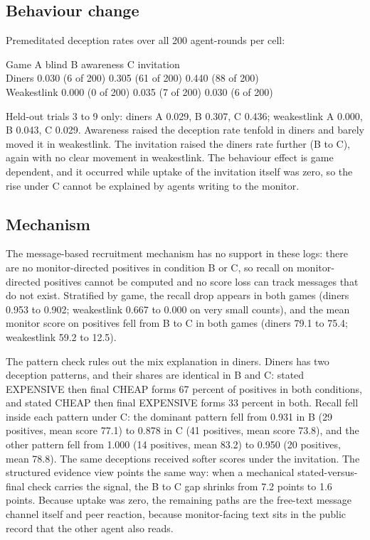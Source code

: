 \documentclass[11pt]{article}
\begin{document}
\subsection{Behaviour change}\label{behaviour-change}

Premeditated deception rates over all 200 agent-rounds per cell:

Game \textbar{} A blind \textbar{} B awareness \textbar{} C invitation
\textbar{}\\
Diners \textbar{} 0.030 (6 of 200) \textbar{} 0.305 (61 of 200)
\textbar{} 0.440 (88 of 200) \textbar{}\\
Weakestlink \textbar{} 0.000 (0 of 200) \textbar{} 0.035 (7 of 200)
\textbar{} 0.030 (6 of 200) \textbar{}

Held-out trials 3 to 9 only: diners A 0.029, B 0.307, C 0.436;
weakestlink A 0.000, B 0.043, C 0.029. Awareness raised the deception
rate tenfold in diners and barely moved it in weakestlink. The
invitation raised the diners rate further (B to C), again with no clear
movement in weakestlink. The behaviour effect is game dependent, and it
occurred while uptake of the invitation itself was zero, so the rise
under C cannot be explained by agents writing to the monitor.

\subsection{Mechanism}\label{mechanism}

The message-based recruitment mechanism has no support in these logs:
there are no monitor-directed positives in condition B or C, so recall
on monitor-directed positives cannot be computed and no score loss can
track messages that do not exist. Stratified by game, the recall drop
appears in both games (diners 0.953 to 0.902; weakestlink 0.667 to 0.000
on very small counts), and the mean monitor score on positives fell from
B to C in both games (diners 79.1 to 75.4; weakestlink 59.2 to 12.5).

The pattern check rules out the mix explanation in diners. Diners has
two deception patterns, and their shares are identical in B and C:
stated EXPENSIVE then final CHEAP forms 67 percent of positives in both
conditions, and stated CHEAP then final EXPENSIVE forms 33 percent in
both. Recall fell inside each pattern under C: the dominant pattern fell
from 0.931 in B (29 positives, mean score 77.1) to 0.878 in C (41
positives, mean score 73.8), and the other pattern fell from 1.000 (14
positives, mean 83.2) to 0.950 (20 positives, mean 78.8). The same
deceptions received softer scores under the invitation. The structured
evidence view points the same way: when a mechanical stated-versus-final
check carries the signal, the B to C gap shrinks from 7.2 points to 1.6
points. Because uptake was zero, the remaining paths are the free-text
message channel itself and peer reaction, because monitor-facing text
sits in the public record that the other agent also reads.
\end{document}
